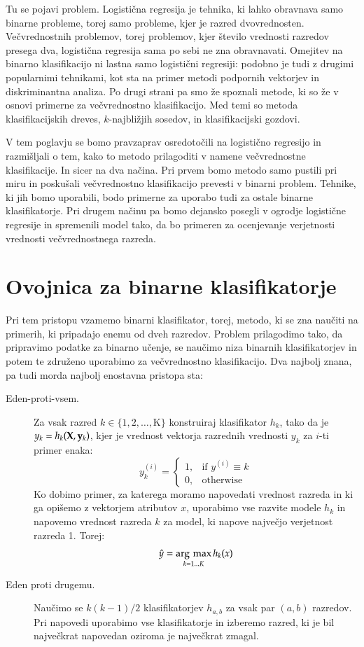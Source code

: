 Tu se pojavi problem. Logistična regresija je tehnika, ki lahko obravnava samo binarne probleme, torej samo probleme, kjer je razred dvovrednosten. Večvrednostnih problemov, torej problemov, kjer število vrednosti razredov presega dva, logistična regresija sama po sebi ne zna obravnavati. Omejitev na binarno klasifikacijo ni lastna samo logistični regresiji: podobno je tudi z drugimi popularnimi tehnikami, kot sta na primer metodi podpornih vektorjev in diskriminantna analiza. Po drugi strani pa smo že spoznali metode, ki so že v osnovi primerne za večvrednostno klasifikacijo. Med temi so metoda klasifikacijskih dreves, $k$-najbližjih sosedov, in klasifikacijski gozdovi.

V tem poglavju se bomo pravzaprav osredotočili na logistično regresijo in razmišljali o tem, kako to metodo prilagoditi v namene večvrednostne klasifikacije. In sicer na dva načina. Pri prvem bomo metodo samo pustili pri miru in poskušali večvrednostno klasifikacijo prevesti v binarni problem. Tehnike, ki jih bomo uporabili, bodo primerne za uporabo tudi za ostale binarne klasifikatorje. Pri drugem načinu pa bomo dejansko posegli v ogrodje logistične regresije in spremenili model tako, da bo primeren za ocenjevanje verjetnosti vrednosti večvrednostnega razreda.

\section{Ovojnica za binarne klasifikatorje}

Pri tem pristopu vzamemo binarni klasifikator, torej, metodo, ki se zna naučiti na primerih, ki pripadajo enemu od dveh razredov. Problem prilagodimo tako, da pripravimo podatke za binarno učenje, se naučimo niza binarnih klasifikatorjev in potem te združeno uporabimo za večvrednostno klasifikacijo. Dva najbolj znana, pa tudi morda najbolj enostavna pristopa sta:

\begin{description}
\item[Eden-proti-vsem.] Za vsak razred $k\in\{1,2,\ldots,$K$\}$ konstruiraj klasifikator $h_k$, tako da je $y_k=h_k({\bf X},{\bf y}_k)$, kjer je vrednost vektorja razrednih vrednosti $y_k$ za $i$-ti primer enaka:
  $$
  {y_k^{(i)}}=
  \begin{cases}
    1, & \text{if } y^{(i)}\equiv k \\
    0, & \text{otherwise}
  \end{cases}
  $$
  Ko dobimo primer, za katerega moramo napovedati vrednost razreda in ki ga opišemo z vektorjem atributov $x$, uporabimo vse razvite modele $h_k$ in napovemo vrednost razreda $k$ za model, ki napove največjo verjetnost razreda 1. Torej:
  $$\hat{y}=\operatorname*{\arg\,\max}_{k=1\ldots K} h_k(x)$$
\item[Eden proti drugemu.] Naučimo se $k(k-1)/2$ klasifikatorjev $h_{a,b}$ za vsak par $(a,b)$ razredov. Pri napovedi uporabimo vse klasifikatorje in izberemo razred, ki je bil največkrat napovedan oziroma je največkrat zmagal.
\end{description}

